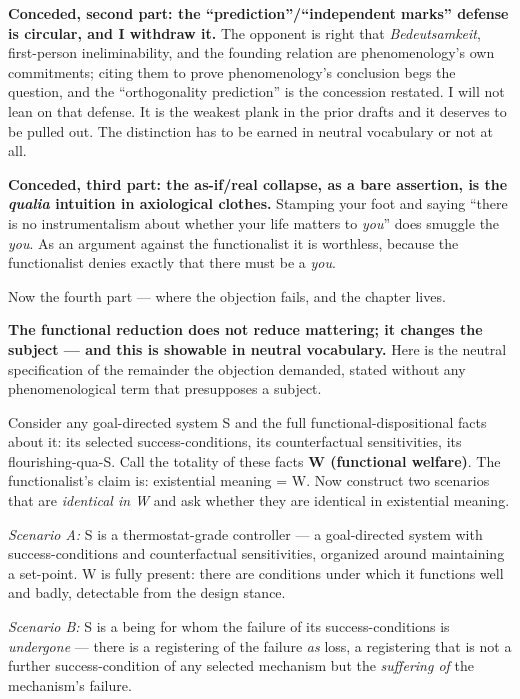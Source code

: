 \documentclass[11pt]{article}
\begin{document}
\textbf{Conceded, second part: the ``prediction''/\allowbreak{}``independent marks'' defense is circular, and I withdraw it.} The opponent is right that \emph{Bedeutsamkeit}, first-person ineliminability, and the founding relation are phenomenology's own commitments; citing them to prove phenomenology's conclusion begs the question, and the ``orthogonality prediction'' is the concession restated. I will not lean on that defense. It is the weakest plank in the prior drafts and it deserves to be pulled out. The distinction has to be earned in neutral vocabulary or not at all.

\textbf{Conceded, third part: the as-if/\allowbreak{}real collapse, as a bare assertion, is the \emph{qualia} intuition in axiological clothes.} Stamping your foot and saying ``there is no instrumentalism about whether your life matters to \emph{you}'' does smuggle the \emph{you}. As an argument against the functionalist it is worthless, because the functionalist denies exactly that there must be a \emph{you}.

Now the fourth part — where the objection fails, and the chapter lives.

\textbf{The functional reduction does not reduce mattering; it changes the subject — and this is showable in neutral vocabulary.} Here is the neutral specification of the remainder the objection demanded, stated without any phenomenological term that presupposes a subject.

Consider any goal-directed system S and the full functional-dispositional facts about it: its selected success-conditions, its counterfactual sensitivities, its flourishing-qua-S. Call the totality of these facts \textbf{W (functional welfare)}. The functionalist's claim is: existential meaning = W. Now construct two scenarios that are \emph{identical in W} and ask whether they are identical in existential meaning.

\emph{Scenario A:} S is a thermostat-grade controller — a goal-directed system with success-conditions and counterfactual sensitivities, organized around maintaining a set-point. W is fully present: there are conditions under which it functions well and badly, detectable from the design stance.

\emph{Scenario B:} S is a being for whom the failure of its success-conditions is \emph{undergone} — there is a registering of the failure \emph{as} loss, a registering that is not a further success-condition of any selected mechanism but the \emph{suffering of} the mechanism's failure.
\end{document}
